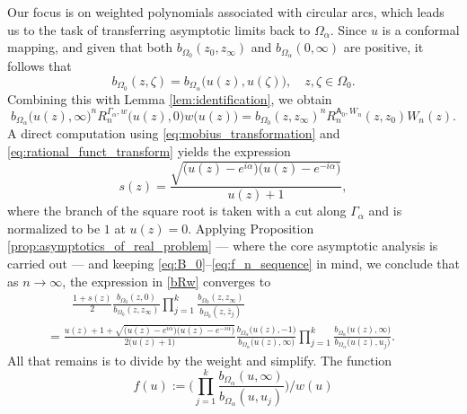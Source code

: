 \documentclass[12pt,oneside,reqno]{amsart}
\theoremstyle{definition}
\numberwithin{equation}{section}
\newcommand{\sfA}{\mathsf{A}}
\begin{document}
Our focus is on weighted polynomials associated with circular arcs, which leads us to the task of transferring asymptotic limits back to $\Omega_\alpha$. 
Since $u$ is a conformal mapping, %
and given that both $b_{\Omega_0}(z_0, z_\infty)$ and $b_{\Omega_\alpha}(0, \infty)$ are positive, it follows that
\begin{equation}
   b_{\Omega_0}(z, \zeta) = b_{\Omega_\alpha}\bigl(u(z), u(\zeta)\bigr), \quad z, \zeta \in\Omega_0.
\end{equation}
Combining this with Lemma \ref{lem:identification}, we obtain
\begin{equation} \label{bRw}
   b_{\Omega_\alpha}\bigl(u(z),\infty\bigr)^n R_{n}^{\Gamma_\alpha,w}\bigl(u(z),0\bigr)
   w\bigl(u(z)\bigr)
   =b_{\Omega_0}(z,z_\infty)^nR_n^{\sfA_0,W_n}(z,z_0)W_n(z).
\end{equation}  
A direct computation using \eqref{eq:mobius_transformation} and \eqref{eq:rational_funct_transform} yields the expression
\begin{equation}
\label{s}
   s(z) = \frac{\sqrt{\bigl(u(z)-e^{i\alpha}\bigr)\bigl(u(z)-e^{-i\alpha}\bigr)}}{u(z)+1},
\end{equation}
where the branch of the square root is taken with a cut along $\Gamma_\alpha$ and is normalized to be $1$ at $u(z)=0$. %
Applying Proposition \ref{prop:asymptotics_of_real_problem} --- where the core asymptotic analysis is carried out --- and keeping \eqref{eq:B_0}--\eqref{eq:f_n_sequence} in mind, we conclude that as $n\to\infty$, the expression in \eqref{bRw} converges to
\begin{multline} 
    \qquad \frac{1+s(z)}{2} \frac{b_{\Omega_0}(z,0)}{b_{\Omega_0}(z,z_\infty)}
    \prod_{j=1}^{k}\frac{b_{\Omega_0}(z,z_\infty)}{b_{\Omega_0}(z,\overline{z}_j)}  \\
    =\frac{u(z)+1+\sqrt{\bigl(u(z)-e^{i\alpha}\bigr)\bigl(u(z)-e^{-i\alpha}\bigr)}}{2\bigl( u(z)+1 \bigr)}
    \frac{b_{\Omega_\alpha}\bigl(u(z), -1\bigr)}{b_{\Omega_\alpha}\bigl(u(z),\infty\bigr)}
    \prod_{j=1}^{k}\frac{b_{\Omega_\alpha}\bigl(u(z),\infty\bigr)}{b_{\Omega_\alpha}\bigl(u(z), u_j\bigr)}. 
    \qquad
\end{multline}
All that remains is to divide by the weight and simplify. 
The function 
\begin{equation}
   f(u):= \biggl( \prod_{j=1}^{k} \frac{b_{\Omega_\alpha}(u,\infty)}{b_{\Omega_\alpha}(u,u_j)} \biggr) 
   \Big/ w(u)
\end{equation} 
\end{document}
